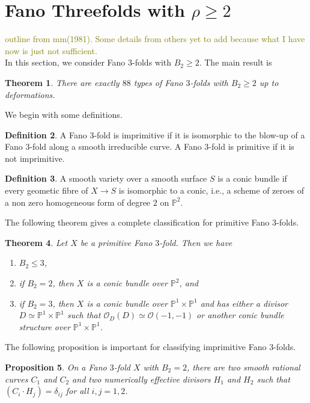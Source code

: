\documentclass[11pt]{amsart}
\theoremstyle{plain}
\newtheorem{theorem}{Theorem}[section]
\newtheorem{proposition}[theorem]{Proposition}
\theoremstyle{definition}
\newtheorem{definition}[theorem]{Definition}
\theoremstyle{expl}
\begin{document}
	
	
	
	
	
\section{Fano Threefolds with $\rho \geq 2$}
	\textcolor{olive}{outline from mm(1981). Some details from others yet to add because what I have now is just not sufficient.}\\ 
	In this section, we consider Fano $3$-folds with $B_2 \geq 2$. The main result is 
	\begin{theorem}
	There are exactly $88$ types of Fano $3$-folds with $B_2 \geq 2$ up to deformations.
	\end{theorem}
	We begin with some definitions. 
	\begin{definition}
		A Fano $3$-fold is imprimitive if it is isomorphic to the blow-up of a Fano $3$-fold along a smooth irreducible curve. A Fano $3$-fold is primitive if it is not imprimitive.
	\end{definition}
    \begin{definition}
    	A smooth variety over a smooth surface $S$ is a conic bundle if every geometic fibre of $X \to S$ is isomorphic to a conic, i.e., a scheme of zeroes of a non zero homogeneous form of degree $2$ on $\mathbb{P}^2$.
    \end{definition}
    \noindent The following theorem gives a complete classification for primitive Fano $3$-folds.
    \begin{theorem}
    	Let $X$ be a primitive Fano $3$-fold. Then we have 
    	\begin{enumerate}
    		\item $B_2 \leq 3$,
		\item if $B_2 =2$, then $X$ is a conic bundle over $\mathbb{P}^2$, and
    		\item if $B_2 =3$, then $X$ is a conic bundle over $\mathbb{P}^1 \times \mathbb{P}^1$ and has either a divisor $D \simeq \mathbb{P}^1 \times \mathbb{P}^1$ such that $\mathcal{O}_D(D) \simeq \mathcal{O}(-1,-1)$ or another conic bundle structure over $\mathbb{P}^1 \times \mathbb{P}^1$.
    	\end{enumerate}
    \end{theorem}
      \noindent The following proposition is important for classifying imprimitive Fano $3$-folds.
    \begin{proposition}
    	On a Fano $3$-fold $X$ with $B_2 =2$, there are two smooth rational curves $C_1$ and $C_2$ and two numerically effective divisors $H_1$ and $H_2$ such that $(C_i \cdot H_j)= \delta_{ij}$ for all $i,j=1,2$. 
    \end{proposition}
\end{document}
